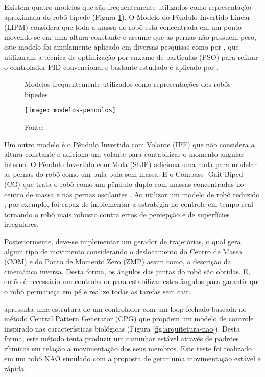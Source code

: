 Existem quatro modelos que são frequentemente utilizados como representação aproximada do robô bípede (Figura \ref{fig:modelos-pendulos}). O Modelo do Pêndulo Invertido Linear (LIPM) considera que toda a massa do robô está concentrada em um ponto movendo-se em uma altura constante e assume que as pernas não possuem peso,  este modelo foi amplamente aplicado em diversas pesquisas como  por , que utilizaram a técnica de optimização por enxame de partículas (PSO) para refinar o controlador PID convencional e bastante estudado e aplicado por .

\begin{figure} [H]
    \centering
    \caption{Modelos frequentemente utilizados como representações dos robôs bípedes}
    \texttt{[image: modelos-pendulos]}
    \caption*{Fonte: \cite{Grizzle20141955}.}
    \label{fig:modelos-pendulos}
\end{figure}

Um outro modelo é o Pêndulo Invertido com Volante (IPF) que não considera a altura constante e adiciona um volante para contabilizar o momento angular interno. O Pêndulo Invertido com Mola (SLIP) adiciona uma mola para modelar as pernas do robô como um pula-pula sem massa. E o Compass -Gait Biped (CG) que trata o robô como um pêndulo duplo com massas concentradas no centro de massa e nas pernas oscilantes \cite{Grizzle20141955}. Ao utilizar um modelo de robô reduzido , por exemplo, foi capaz de implementar a estratégia no controle em tempo real tornando o robô mais robusto contra erros de percepção e de superfícies irregulares. 

Posteriormente, deve-se implementar um gerador de trajetórias, o qual gera algum tipo de movimento considerando o deslocamento do Centro de Massa (COM) e do Ponto de Momento Zero (ZMP) assim como, a descrição da cinemática inversa. Desta forma, os ângulos das juntas do robô são obtidas. E, então é necessário um controlador para estabilizar estes ângulos  para garantir que o robô permaneça em pé e realize todas as tarefas sem cair. \cite{Kashyap2021306}

 apresenta uma estrutura de um controlador com um loop fechado baseada no método Central Pattern Generator (CPG) que propõem um modelo de controle inspirado nas características biológicas (Figura \ref{fig:arquitetura-nao}). Desta forma, este método tenta produzir um caminhar estável através de padrões rítmicos em relação a movimentação dos seus membros. Este teste foi realizado em um robô NAO simulado com a proposta de gerar uma movimentação estável e rápida.

